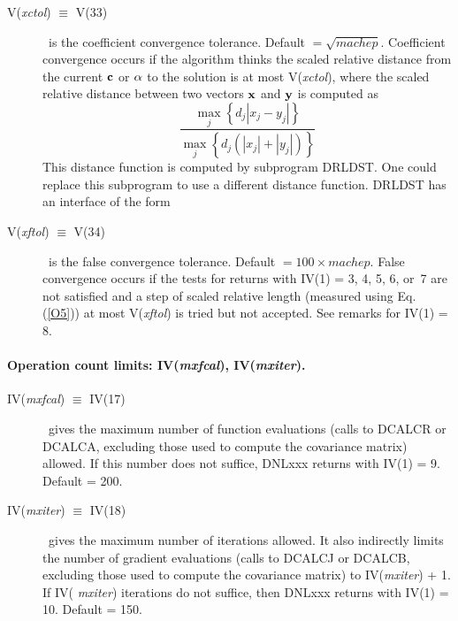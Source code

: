 \documentclass[twoside]{MATH77}
\begin{document}
\begin{description}
\item[V({\em xctol}) $\equiv $ V(33)] \ is the coefficient convergence
  tolerance.  Default $=\sqrt {machep}.$ Coefficient convergence
  occurs if the algorithm thinks the scaled relative distance from the
  current ${\bf c}$ or ${\bf %
    \alpha }$ to the solution is at most V({\em xctol}), where the
  scaled relative distance between two vectors ${\bf x}$ and ${\bf y}$
  is computed as
\begin{equation}
  \label{O5}\frac{\max _j\left\{ d_j|x_j-y_j|\right\} }{\max _j\left\{
      d_j\left( |x_j|+|y_j|\right) \right\} }
\end{equation}
This distance function is computed by subprogram DRLDST. One could
replace this subprogram to use a different distance function. DRLDST
has an interface of the form \vspace{-6pt}{\tt \begin{tabbing}
    DOUBLE PRECISION FUNCTION DRLDST(NX,D,X,Y)\\
    INTEGER NX\\
    DOUBLE PRECISION D(NX), X(NX), Y(NX)
\end{tabbing}}\vspace{-6pt}
\item[V({\em xftol}) $\equiv $ V(34)] \ is the false convergence
  tolerance.  Default $=100\times machep$. False convergence occurs if
  the tests for returns with IV(1) = 3, 4, 5, 6, or~7 are not
  satisfied and a step of scaled relative length (measured using
  Eq.\,(\ref{O5})) at most V({\em xftol}) is tried but not
  accepted. See remarks for IV(1) = 8.
\end{description}
\paragraph{Operation count limits: IV({\em mxfcal}), IV({\em mxiter}).}
\begin{description}
\item[IV({\em mxfcal}) $\equiv $ IV(17)] \ gives the maximum number of
  function evaluations (calls to DCALCR or DCALCA, excluding those
  used to compute the covariance matrix) allowed. If this number does
  not suffice, DNLxxx returns with IV(1) = 9. Default = 200.

\item[IV({\em mxiter}) $\equiv $ IV(18)] \ gives the maximum number of
  iterations allowed. It also indirectly limits the number of gradient
  evaluations (calls to DCALCJ or DCALCB, excluding those used to
  compute the covariance matrix) to IV({\em mxiter}) + 1. If IV({\em
    mxiter}) iterations do not suffice, then DNLxxx returns with IV(1)
  = 10. Default = 150.
\end{description}
\end{document}
